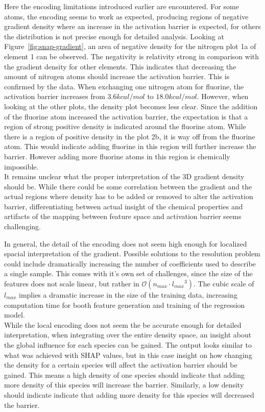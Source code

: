 Here the encoding limitations introduced earlier are encountered.
For some atoms, the encoding seems to work as expected, producing regions of negative gradient density where
an increase in the activation barrier is expected, for others the distribution is not precise enough for detailed analysis.
Looking at Figure~\ref{fig:snap-gradient}, an area of negative density for the nitrogen plot 1a of element 1 can be observed.
The negativity is relativity strong in comparison with the gradient density for other elements.
This indicates that decreasing the amount of nitrogen atoms should increase the activation barrier.
This is confirmed by the data.
When exchanging one nitrogen atom for fluorine, the activation barrier increases from $3.6 kcal/mol$ to $18.0kcal/mol$.
However, when looking at the other plots, the density plot becomes less clear.
Since the addition of the fluorine atom increased the activation barrier, the expectation is that a region of strong positive
density is indicated around the fluorine atom.
While there is a region of positive density in the plot 2b, it is way off from the fluorine atom.
This would indicate adding fluorine in this region will further increase the barrier.
However adding more fluorine atoms in this region is chemically impossible. %
\\

It remains unclear what the proper interpretation of the 3D gradient density should be.
While there could be some correlation between the gradient and the actual regions where density has to be added or
removed to alter the activation barrier, differentiating between actual insight of the chemical properties and artifacts 
of the mapping between feature space and activation barrier seems challenging.

In general, the detail of the encoding does not seem high enough for localized spacial interpretation of the gradient.
Possible solutions to the resolution problem could include dramatically increasing the number of coefficients used to describe a single sample.
This comes with it's own set of challenges, since the size of the features does not scale linear, but rather in $\mathcal{O}(n_{max} \cdot {l_{max}}^3)$.
The cubic scale of $l_{max}$ implies a dramatic increase in the size of the training data, increasing computation time for booth feature generation and training of the regression model.
\\

While the local encoding does not seem the be accurate enough for detailed interpretation,
when integrating over the entire density space, an insight about the global influence for each species can be gained.
The output looks similar to what was achieved with SHAP values, but in this case insight on how changing the density for a certain species will affect the activation barrier should be gained.
This means a high density of one species should indicate that adding more density of this species will increase the barrier.
Similarly, a low density should indicate indicate that adding more density for this species will decreased the barrier. %

